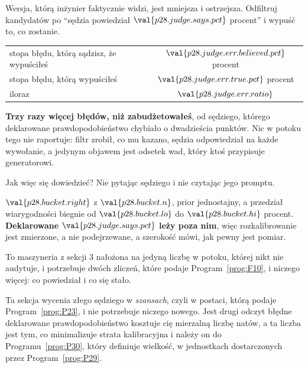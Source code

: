 \begin{fr}
Wersja, którą inżynier faktycznie widzi, jest mniejsza i ostrzejsza. Odfiltruj
kandydatów po \enquote{sędzia powiedział $\val{p28.judge.says.pct}$ procent} i
wypuść to, co zostanie.

\begin{center}
\begin{tabular}{lc}
\toprule
stopa błędu, którą sądzisz, że wypuściłeś & $\val{p28.judge.err.believed.pct}$ procent \\
stopa błędu, którą wypuściłeś & $\val{p28.judge.err.true.pct}$ procent \\
\midrule
iloraz & $\val{p28.judge.err.ratio}$ \\
\bottomrule
\end{tabular}
\end{center}

\textbf{Trzy razy więcej błędów, niż zabudżetowałeś}, od sędziego, którego
deklarowane prawdopodobieństwo chybiało o dwadzieścia punktów. Nic w potoku
tego nie raportuje: filtr zrobił, co mu kazano, sędzia odpowiedział na każde
wywołanie, a jedynym objawem jest odsetek wad, który ktoś przypisuje
generatorowi.

Jak więc się dowiedzieć? Nie pytając sędziego i nie czytając jego promptu.
\dotline
\nextframe
\end{fr}

\begin{fr}

$\val{p28.bucket.right}$ z $\val{p28.bucket.n}$, prior jednostajny, a przedział
wiarygodności biegnie od $\val{p28.bucket.lo}$ do $\val{p28.bucket.hi}$
procent. \textbf{Deklarowane $\val{p28.judge.says.pct}$ leży poza nim}, więc
rozkalibrowanie jest zmierzone, a nie
podejrzewane, a szerokość mówi, jak
pewny jest pomiar.

To maszyneria z sekcji 3 nałożona na jedyną liczbę w potoku, której nikt nie
audytuje, i potrzebuje dwóch zliczeń, które podaje Program~\ref{prog:F10}, i
niczego więcej: co powiedział i co się stało.

\begin{note}
Ta sekcja wycenia złego sędziego w \emph{szansach}, czyli w postaci, którą
podaje Program~\ref{prog:P23}, i nie potrzebuje niczego nowego. Jest drugi
odczyt \dash{} błędne deklarowane prawdopodobieństwo kosztuje cię mierzalną
liczbę natów, a ta liczba jest tym, co minimalizuje strata kalibracyjna
\dash{} i należy on do Programu~\ref{prog:P30}, który definiuje wielkość,
w jednostkach dostarczonych przez Program~\ref{prog:P29}.
\end{note}
\end{fr}

